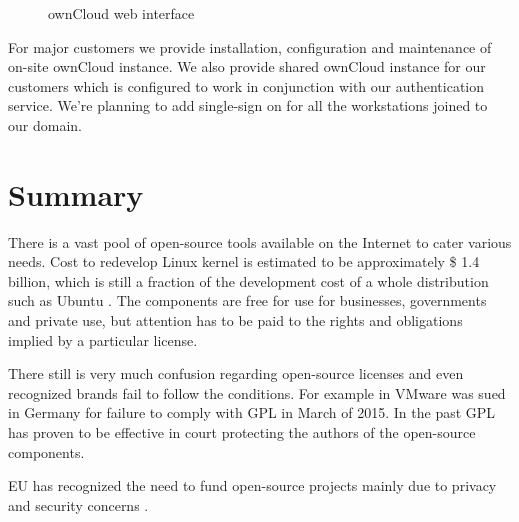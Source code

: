 \documentclass{article}
\begin{document}
\begin{figure}[!htb]
\centering
{}
\caption{ownCloud web interface}
\label{fig:digraph}
\end{figure}

For major customers we provide installation,
configuration and maintenance of on-site ownCloud instance.
We also provide shared ownCloud instance
for our customers which is configured to work
in conjunction with our authentication service.
We're planning to add single-sign on
for all the workstations joined to our domain.



\section{Summary}

There is a vast pool of open-source tools available on the Internet
to cater various needs.
Cost to redevelop Linux kernel is estimated to be
approximately \$ 1.4 billion, which is still a fraction
of the development cost of a whole distribution such as Ubuntu
\cite{estimating-cost-of-linux-distro}.
The components are free for use for businesses, governments and
private use, but attention has to be paid to the rights
and obligations implied by a particular license.

There still is very much confusion regarding open-source licenses
and even recognized brands fail to follow the conditions.
For example in VMware was sued in Germany for failure to comply with GPL
\cite{vmware-sued} in March of 2015.
In the past GPL has proven to be effective in court protecting
the authors of the open-source components.

EU has recognized the need to fund open-source projects
mainly due to privacy and security concerns
\cite{eu-should-finance-open-source}.
\end{document}
